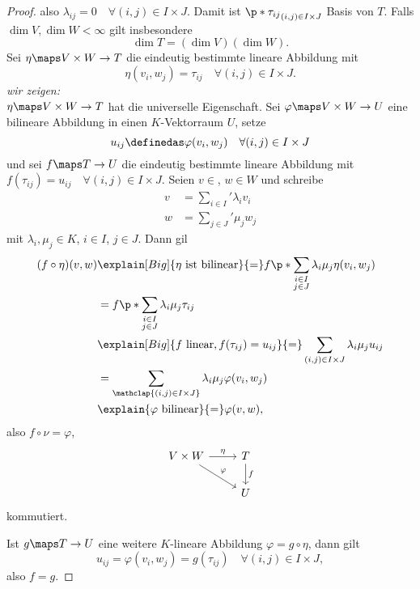 \begin{proof}
  also \( \lambda_{ij}=0\quad \forall (i,j)\in I\times J \). Damit ist \( \p*{\tau_{ij}}_{(i,j)\in I\times J} \) Basis von \( T \). Falls \( \dim{V},\dim{W}<\infty \) gilt insbesondere
  \begin{equation*}
    \dim{T}=(\dim{V})(\dim{W}).
  \end{equation*}
  Sei \( \eta\maps V\times W\to T \) die eindeutig bestimmte lineare Abbildung mit
  \begin{equation*}
    \eta(v_i,w_j)=\tau_{ij}\quad \forall (i,j)\in I\times J.
  \end{equation*}
  \emph{wir zeigen:}\\
  \( \eta\maps V\times W\to T \) hat die universelle Eigenschaft. Sei \( \varphi\maps V\times W\to U \) eine bilineare Abbildung in einen \( K \)-Vektorraum \( U \), setze
  \begin{equation*}
    u_{ij}\definedas \varphi(v_i,w_j)\quad \forall (i,j)\in I\times J
  \end{equation*}
  und sei \( f\maps T\to U \) die eindeutig bestimmte lineare Abbildung mit \( f(\tau_{ij})=u_{ij} \quad \forall (i,j)\in I\times J\). Seien \( v\in  \), \( w\in W \) und schreibe 
  \begin{align*}
    v&={\sum_{i\in I}}'\lambda_i v_i\\
    w&={\sum_{j\in J}}'\mu_j w_j
  \end{align*}
  mit \( \lambda_i,\mu_j\in K \), \( i\in I \), \( j\in J \). Dann gil
  \begin{align*}
    (f\circ \eta)(v,w)&\explain[Big]{\eta \text{ ist bilinear}}{=}f\p*{\sum_{\substack{i\in I\\ j\in J}}\lambda_i \mu_j \eta(v_i,w_j)}\\
    &=f\p*{\sum_{\substack{i\in I\\ j\in J}}\lambda_i \mu_j \tau_{ij}}\\
    &\explain[Big]{f \text{ linear},f(\tau_{ij})=u_{ij}}{=}\sum_{(i,j)\in I\times J}\lambda_i \mu_j u_{ij}\\
    &=\sum_{\mathclap{(i,j)\in I\times J}}\lambda_i \mu_j \varphi(v_i,w_j)\\
    &\explain{\varphi \text{ bilinear}}{=}\varphi(v,w),
  \end{align*}
  also \( f\circ \nu=\varphi \), \dh
  \begin{equation*}
    \begin{tikzcd}
      V\times W\arrow[r,"\eta"]\arrow[dr,"\varphi"]&T\arrow[d,"f"]\\
      &U
    \end{tikzcd}
  \end{equation*}
  kommutiert.

  Ist \( g\maps T\to U \) eine weitere \( K \)-lineare Abbildung \( \varphi=g\circ \eta \), dann gilt
  \begin{equation*}
    u_{ij}=\varphi(v_i,w_j)=g(\tau_{ij})\quad \forall (i,j)\in I\times J,
  \end{equation*}
  also \( f=g \).
\end{proof}
